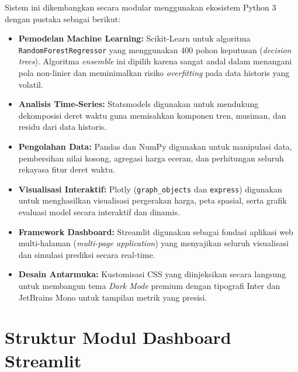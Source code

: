 \documentclass[12pt, a4paper]{article}
\begin{document}
Sistem ini dikembangkan secara modular menggunakan ekosistem Python 3 dengan pustaka sebagai berikut:
\begin{itemize}
    \item \textbf{Pemodelan Machine Learning:} Scikit-Learn untuk algoritma \texttt{RandomForestRegressor} yang menggunakan 400 pohon keputusan (\textit{decision trees}). Algoritma \textit{ensemble} ini dipilih karena sangat andal dalam menangani pola non-linier dan meminimalkan risiko \textit{overfitting} pada data historis yang volatil.
    \item \textbf{Analisis Time-Series:} Statsmodels digunakan untuk mendukung dekomposisi deret waktu guna memisahkan komponen tren, musiman, dan residu dari data historis.
    \item \textbf{Pengolahan Data:} Pandas dan NumPy digunakan untuk manipulasi data, pembersihan nilai kosong, agregasi harga eceran, dan perhitungan seluruh rekayasa fitur deret waktu.
    \item \textbf{Visualisasi Interaktif:} Plotly (\texttt{graph\_objects} dan \texttt{express}) digunakan untuk menghasilkan visualisasi pergerakan harga, peta spasial, serta grafik evaluasi model secara interaktif dan dinamis.
    \item \textbf{Framework Dashboard:} Streamlit digunakan sebagai fondasi aplikasi web multi-halaman (\textit{multi-page application}) yang menyajikan seluruh visualisasi dan simulasi prediksi secara real-time.
    \item \textbf{Desain Antarmuka:} Kustomisasi CSS yang diinjeksikan secara langsung untuk membangun tema \textit{Dark Mode} premium dengan tipografi Inter dan JetBrains Mono untuk tampilan metrik yang presisi.
\end{itemize}

\section{Struktur Modul Dashboard Streamlit}
\end{document}
